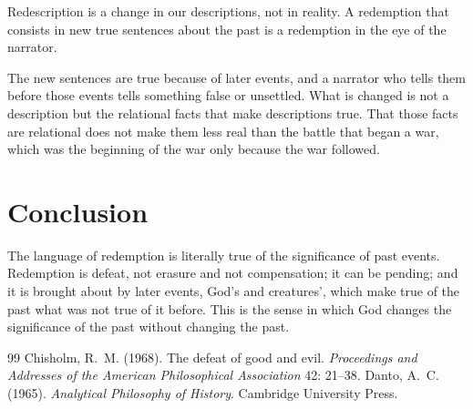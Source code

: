 \documentclass{situationist-preprint}
\begin{document}
\begin{objection}
Redescription is a change in our descriptions, not in reality. A redemption that consists in new true sentences about the past is a redemption in the eye of the narrator.
\end{objection}

\begin{reply}
The new sentences are true because of later events, and a narrator who tells them before those events tells something false or unsettled. What is changed is not a description but the relational facts that make descriptions true. That those facts are relational does not make them less real than the battle that began a war, which was the beginning of the war only because the war followed.
\end{reply}

\section{Conclusion}

The language of redemption is literally true of the significance of past events. Redemption is defeat, not erasure and not compensation; it can be pending; and it is brought about by later events, God's and creatures', which make true of the past what was not true of it before. This is the sense in which God changes the significance of the past without changing the past.

\begin{thebibliography}{99}\small
{} Chisholm, R.~M. (1968). The defeat of good and evil. \emph{Proceedings and Addresses of the American Philosophical Association} 42: 21--38.
 Danto, A.~C. (1965). \emph{Analytical Philosophy of History}. Cambridge University Press.
\end{thebibliography}
\end{document}
